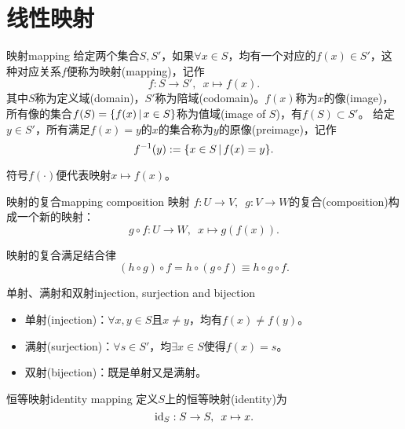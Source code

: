 \chapter{线性映射}
\label{chap:linear mapping}

\begin{definition}{映射}{mapping}
	给定两个集合$S,S'$，如果$\forall x\in S$，均有一个对应的$f(x)\in S'$，这种对应关系$f$便称为映射(mapping)，记作
	\begin{equation}
		f:S\to S',\enspace x\mapsto f(x).
	\end{equation}
	其中$S$称为定义域(domain)，$S'$称为陪域(codomain)。$f(x)$称为$x$的像(image)，所有像的集合$f(S)=\{f(x)\,|\,x\in S\}$称为值域(image of $S$)，有$f(S)\subset S'$。
	\tcblower
	给定$y\in S'$，所有满足$f(x)=y$的$x$的集合称为$y$的原像(preimage)，记作
	\begin{equation}
		f^{-1}(y):=\{x\in S\,|\,f(x)=y\}.
	\end{equation}
\end{definition}

\begin{remark}
	符号$f(\cdot)$便代表映射$x\mapsto f(x)$。
\end{remark}

\begin{definition}{映射的复合}{mapping composition}
	映射 $f:U\to V,\enspace g:V\to W$的复合(composition)构成一个新的映射：
	\[
		g\circ f:U\to W,\enspace x\mapsto g(f(x)).
	\]
\end{definition}
\begin{corollary}
	映射的复合满足结合律
	\[
		(h\circ g)\circ f=h\circ (g\circ f)\equiv h\circ g\circ f.
	\]
\end{corollary}
\begin{definition}{单射、满射和双射}{injection, surjection and bijection}
	\begin{itemize}
		\item 单射(injection)：$\forall x,y\in S$且$x\neq y$，均有$f(x)\neq f(y)$。
		\item 满射(surjection)：$\forall s\in S'$，均$\exists x\in S$使得$f(x)=s$。%
		\item 双射(bijection)：既是单射又是满射。
	\end{itemize}
\end{definition}

\begin{definition}
	{恒等映射}{identity mapping}
	定义$S$上的恒等映射(identity)为
	\begin{equation}
		\operatorname{id}_S:S\to S,\enspace x\mapsto x.
	\end{equation}
\end{definition}


